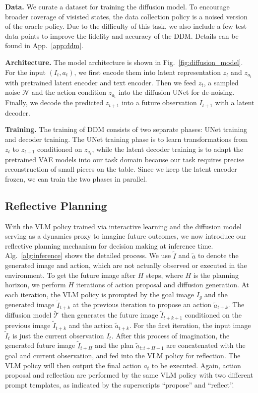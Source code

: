 \noindent \textbf{Data.} We curate a dataset for training the diffusion model. To encourage broader coverage of visisted states, the data collection policy is a noised version of the oracle policy.
Due to the difficulty of this task, we also include a few test data points to improve the fidelity and accuracy of the DDM.
Details can be found in App.~\ref{app:ddm}.

\noindent \textbf{Architecture.} The model architecture is shown in Fig.~\ref{fig:diffusion_model}. For the input $(I_t, a_t)$, we first encode them into latent representation $z_t$ and $z_{a_t}$ with pretrained latent encoder and text encoder. Then we feed $z_t$, a sampled noise $\mathcal{N}$ and the action condition $z_{a_t}$ into the diffusion UNet for de-noising. Finally, we decode the predicted $z_{t+1}$ into a future observation $I_{t+1}$ with a latent decoder.

\noindent \textbf{Training.} The training of DDM consists of two separate phases: UNet training and decoder training. The UNet training phase is to learn transformations from $z_t$ to $z_{t+1}$ conditioned on $z_{a_t}$, while the latent decoder training is to adapt the pretrained VAE models into our task domain because our task requires precise reconstruction of small pieces on the table. Since we keep the latent encoder frozen, we can train the two phases in parallel.

\subsection{Reflective Planning}\label{sec:reflection}

With the VLM policy trained via interactive learning and the diffusion model serving as a dynamics proxy to imagine future outcomes, we now introduce our reflective planning mechanism for decision making at inference time. Alg.~\ref{alg:inference} shows the detailed process. We use $\tilde{I}$ and ${\tilde{a}}$ to denote the generated image and action, which are not actually observed or executed in the environment. To get the future image after $H$ steps, where $H$ is the planning horizon, we perform $H$ iterations of action proposal and diffusion generation. At each iteration, the VLM policy is prompted by the goal image $I_g$ and the generated image $\tilde{I}_{t+k}$ at the previous iteration to propose an action $\tilde{a}_{t+k}$. The diffusion model $\tilde{\mathcal{T}}$ then generates the future image $\tilde{I}_{t+k+1}$ conditioned on the previous image $\tilde{I}_{t+k}$ and the action $\tilde{a}_{t+k}$. For the first iteration, the input image $\tilde{I}_t$ is just the current observation $I_t$. After this process of imagination, the generated future image $\tilde{I}_{t+H}$ and the plan $\tilde{a}_{t:t+H-1}$ are concatenated with the goal and current observation, and fed into the VLM policy for reflection. The VLM policy will then output the final action $a_t$ to be executed. Again, action proposal and reflection are performed by the same VLM policy with two different prompt templates, as indicated by the superscripts ``propose'' and ``reflect''.

